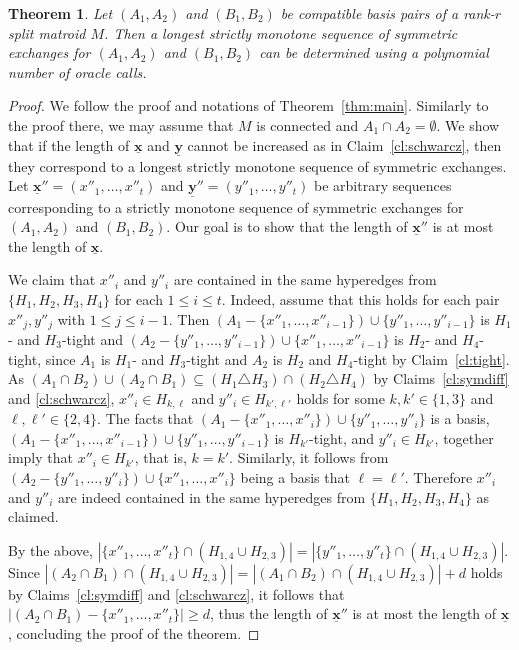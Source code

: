 \documentclass[11pt,a4paper]{article}
\theoremstyle{plain}
\newtheorem{thm}{Theorem}
\theoremstyle{definition}
\newcommand{\ul}[1]{\underline{\mathbf{#1}}}
\begin{document}
\begin{thm} \label{thm:alg}
Let $(A_1, A_2)$ and $(B_1,B_2)$ be compatible basis pairs of a rank-$r$ split matroid $M$. Then a longest strictly monotone sequence of symmetric exchanges for $(A_1,A_2)$ and $(B_1,B_2)$ can be determined using a polynomial number of oracle calls.
\end{thm}
\begin{proof}
We follow the proof and notations of Theorem~\ref{thm:main}. Similarly to the proof there, we may assume that $M$ is connected and $A_1\cap A_2=\emptyset$. We show that if the length of $\ul{x}$ and $\ul{y}$ cannot be increased as in Claim~\ref{cl:schwarcz}, then they correspond to a longest strictly monotone sequence of symmetric exchanges. Let $\ul{x}'' = (x''_1, \dots, x''_t)$ and $\ul{y}'' = (y''_1, \dots, y''_t)$ be arbitrary sequences corresponding to a strictly monotone sequence of symmetric exchanges for $(A_1, A_2)$ and $(B_1, B_2)$. Our goal is to show that the length of $\ul{x}''$ is at most the length of $\ul{x}$.

We claim that $x''_i$ and $y''_i$ are contained in the same hyperedges from $\{H_1, H_2, H_3, H_4\}$ for each $1\le i \le t$. Indeed, assume that this holds for each pair $x''_j,y''_j$ with $1\leq j\leq i-1$. Then $(A_1-\{x''_1, \dots, x''_{i-1}\})\cup \{y''_1, \dots, y''_{i-1}\}$ is $H_1$- and $H_3$-tight and $(A_2-\{y''_1,\dots, y''_{i-1}\})\cup \{x''_1, \dots, x''_{i-1}\}$ is $H_2$- and $H_4$-tight, since $A_1$ is $H_1$- and $H_3$-tight and $A_2$ is $H_2$ and $H_4$-tight by Claim~\ref{cl:tight}. As $(A_1\cap B_2) \cup (A_2 \cap B_1) \subseteq (H_1 \triangle H_3) \cap (H_2 \triangle H_4)$ by Claims~\ref{cl:symdiff} and \ref{cl:schwarcz}, $x''_i \in H_{k,\ell}$ and $y''_i \in H_{k',\ell'}$ holds for some $k,k'\in \{1,3\}$ and $\ell,\ell'\in \{2,4\}$. The facts that $(A_1-\{x''_1, \dots, x''_i\})\cup \{y''_1, \dots, y''_i\}$ is a basis, $(A_1-\{x''_1, \dots, x''_{i-1}\})\cup \{y''_1, \dots, y''_{i-1}\}$ is $H_{k'}$-tight, and $y''_i \in H_{k'}$, together imply that $x''_i \in H_{k'}$, that is, $k=k'$. Similarly, it follows from $(A_2-\{y''_1,\dots, y''_i\})\cup \{x''_1,\dots, x''_i\}$ being a basis that $\ell=\ell'$. Therefore $x''_i$ and $y''_i$ are indeed contained in the same hyperedges from $\{H_1,H_2,H_3,H_4\}$ as claimed.

By the above, $|\{x''_1, \dots, x''_t\} \cap (H_{1,4} \cup H_{2,3})| = |\{y''_1, \dots, y''_t\} \cap (H_{1,4} \cup H_{2,3})|$. Since $|(A_2 \cap B_1) \cap (H_{1,4} \cup H_{2,3})| = |(A_1 \cap B_2) \cap (H_{1,4} \cup H_{2,3})|+d$ holds by Claims~\ref{cl:symdiff} and \ref{cl:schwarcz}, it follows that $|(A_2 \cap B_1) - \{x''_1, \dots, x''_t\}| \ge d$, thus the length of $\ul{x}''$ is at most the length of $\ul{x}$, concluding the proof of the theorem.
\end{proof}
\end{document}
